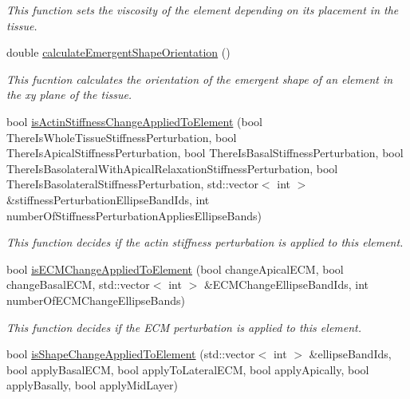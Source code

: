 \begin{DoxyCompactItemize}
\begin{DoxyCompactList}\small\item\em This function sets the viscosity of the element depending on its placement in the tissue. \end{DoxyCompactList}\item 
double \hyperlink{classShapeBase_a3eecbff8db98871f4b5f1ee0992f3d6d}{calculate\+Emergent\+Shape\+Orientation} ()
\begin{DoxyCompactList}\small\item\em This fucntion calculates the orientation of the emergent shape of an element in the xy plane of the tissue. \end{DoxyCompactList}\item 
bool \hyperlink{classShapeBase_ae9cfd1ae56e018477dd3642d4d769d90}{is\+Actin\+Stiffness\+Change\+Applied\+To\+Element} (bool There\+Is\+Whole\+Tissue\+Stiffness\+Perturbation, bool There\+Is\+Apical\+Stiffness\+Perturbation, bool There\+Is\+Basal\+Stiffness\+Perturbation, bool There\+Is\+Basolateral\+With\+Apical\+Relaxation\+Stiffness\+Perturbation, bool There\+Is\+Basolateral\+Stiffness\+Perturbation, std\+::vector$<$ int $>$ \&stiffness\+Perturbation\+Ellipse\+Band\+Ids, int number\+Of\+Stiffness\+Perturbation\+Applies\+Ellipse\+Bands)
\begin{DoxyCompactList}\small\item\em This function decides if the actin stiffness perturbation is applied to this element. \end{DoxyCompactList}\item 
\hypertarget{classShapeBase_ab1572ddb1f68178e0607873a432f227c}{}bool \hyperlink{classShapeBase_ab1572ddb1f68178e0607873a432f227c}{is\+E\+C\+M\+Change\+Applied\+To\+Element} (bool change\+Apical\+E\+C\+M, bool change\+Basal\+E\+C\+M, std\+::vector$<$ int $>$ \&E\+C\+M\+Change\+Ellipse\+Band\+Ids, int number\+Of\+E\+C\+M\+Change\+Ellipse\+Bands)\label{classShapeBase_ab1572ddb1f68178e0607873a432f227c}

\begin{DoxyCompactList}\small\item\em This function decides if the E\+C\+M perturbation is applied to this element. \end{DoxyCompactList}\item 
\hypertarget{classShapeBase_aff9e4c602276e9aec411d7a05e83a118}{}bool \hyperlink{classShapeBase_aff9e4c602276e9aec411d7a05e83a118}{is\+Shape\+Change\+Applied\+To\+Element} (std\+::vector$<$ int $>$ \&ellipse\+Band\+Ids, bool apply\+Basal\+E\+C\+M, bool apply\+To\+Lateral\+E\+C\+M, bool apply\+Apically, bool apply\+Basally, bool apply\+Mid\+Layer)\label{classShapeBase_aff9e4c602276e9aec411d7a05e83a118}


\end{DoxyCompactItemize}
